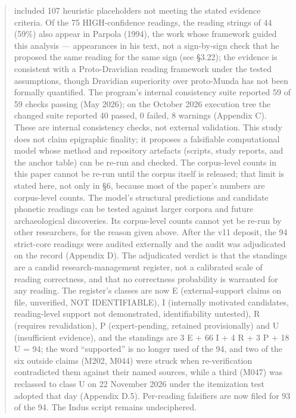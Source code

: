 \documentclass[11pt]{article}
\begin{document}
\begin{abstract}
included 107 heuristic placeholders not meeting the stated evidence
criteria. Of the 75 HIGH-confidence readings, the reading strings of 44 (59\%) also appear in Parpola (1994), the work whose framework guided this analysis --- appearances in his text, not a sign-by-sign check that he proposed the same reading for the same sign (see §3.22); the
evidence is consistent with a Proto-Dravidian reading framework under the
tested assumptions, though Dravidian superiority over proto-Munda has not
been formally quantified. The program's internal consistency suite reported 59 of 59 checks passing (May 2026); on the October 2026 execution tree the changed suite reported 40 passed, 0 failed, 8 warnings (Appendix C). These are internal consistency checks, not external validation. This study does not claim epigraphic finality; it proposes a falsifiable computational model whose method and repository artefacts (scripts, study reports, and the anchor table) can be re-run and checked. The corpus-level counts in this paper cannot be re-run until the corpus itself is released; that limit is stated here, not only in §6, because most of the paper's numbers are corpus-level counts. The model's structural predictions and candidate phonetic readings can be tested against larger corpora and future archaeological discoveries. Its corpus-level counts cannot yet be re-run by other researchers, for the reason given above.
After the v11 deposit, the 94 strict-core readings were audited externally and the audit was adjudicated on the record (Appendix D). The adjudicated verdict is that the standings are a candid research-management register, not a calibrated scale of reading correctness, and that no correctness probability is warranted for any reading. The register's classes are now E (external-support claims on file, unverified, NOT IDENTIFIABLE), I (internally motivated candidates, reading-level support not demonstrated, identifiability untested), R (requires revalidation), P (expert-pending, retained provisionally) and U (insufficient evidence), and the standings are 3 E + 66 I + 4 R + 3 P + 18 U = 94; the word ``supported'' is no longer used of the 94, and two of the six outside claims (M202, M044) were struck when re-verification contradicted them against their named sources, while a third (M047) was reclassed to class U on 22 November 2026 under the itemization test adopted that day (Appendix D.5). Per-reading falsifiers are now filed for 93 of the 94. The Indus script remains undeciphered.
\end{abstract}
\end{document}
